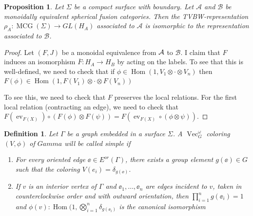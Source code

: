 \documentclass{amsart}
\newtheorem{prop}[thm]{Proposition}
\newtheorem{defn}[thm]{Definition}
\DeclareMathOperator{\MCG}{MCG}
\DeclareMathOperator{\Vect}{Vec}
\DeclareMathOperator{\Homeo}{Homeo}
\DeclareMathOperator{\Hom}{Hom}
\DeclareMathOperator{\ev}{ev}
\newcommand{\one}{1}
\newcommand{\Si}{\Sigma}
\begin{document}




\newcommand{\B}{\mathcal B}

\begin{prop} \label{prop:equivCats}
Let $\Sigma$ be a compact surface with boundary. Let $\mathcal A$ and $\mathcal B$ be monoidally equivalent spherical fusion categories.  Then
the TVBW-representation $\rho_A : \MCG(\Sigma) \to GL(H_A)$ associated to $\mathcal A$ is isomorphic to the representation associated to $\mathcal B$.
\end{prop}
\begin{proof}
Let $(F, J)$ be a monoidal equivalence from $\mathcal{A}$ to $\B$. I claim that $F$ induces an isomorphism $\overline{F}: H_A \to H_B$ by acting on the labels.  To see that this is well-defined, we need to check that if $\phi \in \Hom(\one, V_1 \otimes \cdot \otimes V_n)$ then $F(\phi) \in    \Hom(\one, F(V_1) \otimes \cdot \otimes F(V_n))$


To see this, we need to check that $F$ preserves the local relations.  For the first local relation (contracting an edge), we need to check that $F(\ev_{F(X)}) \circ (F(\phi) \otimes F(\psi)) = F(\ev_{F(X)} \circ (\phi \otimes \psi))$.
\end{proof}



\begin{defn} \label{def:vect}
Let $\Gamma$ be a graph embedded in a surface $\Si$.  A $\Vect_G^\omega$ coloring $(V, \phi)$ of $Gamma$ will be called \emph{simple} if 
\begin{enumerate}
\item For every oriented edge $\ee \in E^{or}(\Gamma)$, there exists a group element $g(\ee) \in G$ such that
the coloring $V(e_i) = \delta_{g(\ee)}$.
\item If $v$ is an interior vertex of $\Gamma$ and
      $\ee_1, \dots, \ee_n$ are edges incident to $v$, taken in counterclockwise 
      order and with outward orientation, then $\prod_{i=1}^n g(\ee_i) = 1$ and
      $\phi(v): \Hom(\one, \bigotimes_{i=1}^n \delta_{g(\ee_i)}$ is the canonical isomorphism
\end{enumerate}
\end{defn}
\end{document}
